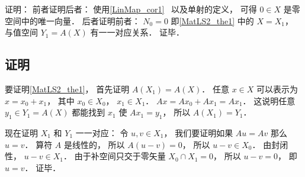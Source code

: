 证明： 前者证明后者： 使用\autoref{LinMap_cor1}~ 以及单射的定义， 可得 $0\in X$ 是零空间中的唯一向量． 后者证明前者： $N_0 = 0$ 即\autoref{MatLS2_the1} 中的 $X = X_1$， 与值空间 $Y_1 = A(X)$ 有一一对应关系． 证毕．

\subsection{证明}
要证明\autoref{MatLS2_the1}， 首先证明 $A(X_1) = A(X)$． 任意 $x\in X$ 可以表示为 $x = x_0 + x_1$， 其中 $x_0\in X_0$， $x_1\in X_1$． $Ax = A x_0 + A x_1 = A x_1$． 这说明任意 $y_1 \in Y_1 = A(X)$ 都能找到 $x_1$ 使 $A x_1 = y_1$， 所以 $A(X_1) = Y_1$．

现在证明 $X_1$ 和 $Y_1$ 一一对应： 令 $u, v \in X_1$， 我们要证明如果 $Au = Av$ 那么 $u = v$． 算符 $A$ 是线性的， 所以 $A(u-v) = 0$， 所以 $u - v \in X_0$． 由封闭性， $u - v \in X_1$． 由于补空间只交于零矢量 $X_0 \cap X_1 = \qty{0}$， 所以 $u - v = 0$， 即 $u = v$． 证毕．

